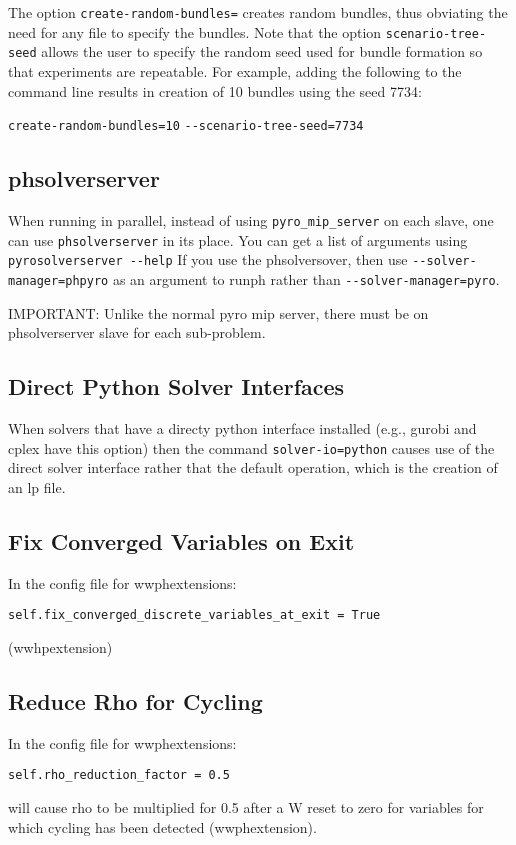 The option \verb|create-random-bundles=| creates random bundles, thus obviating the need for
any file to specify the bundles. Note that the option \verb|scenario-tree-seed| allows the user to specify the random seed used
for bundle formation so that experiments are repeatable.  For example, adding the following to the command line results in creation
of 10 bundles using the seed 7734:

\verb|create-random-bundles=10| \verb|--scenario-tree-seed=7734| 

\subsection{phsolverserver}

When running in parallel, instead of using  \verb|pyro_mip_server| on each slave, one can use
\verb|phsolverserver| in its place. 
You can get a list of arguments using \verb|pyrosolverserver --help|
If you use the phsolversover, then use \verb|--solver-manager=phpyro| as an argument to runph rather
than \verb|--solver-manager=pyro|.

IMPORTANT: Unlike the normal pyro mip server, there must be on phsolverserver slave for each sub-problem. 

\subsection{Direct Python Solver Interfaces}

When solvers that have a directy python interface installed (e.g., gurobi and cplex have this option) then the command \verb|solver-io=python| causes use of the direct solver interface rather that the default operation, which is the creation of an lp file.

\subsection{Fix Converged Variables on Exit}

In the config file for wwphextensions:

\verb|self.fix_converged_discrete_variables_at_exit = True|

(wwhpextension)

\subsection{Reduce Rho for Cycling}

In the config file for wwphextensions:

\verb|self.rho_reduction_factor = 0.5|

will cause rho to be multiplied for 0.5 after a W reset to zero for
variables for which cycling has been detected (wwphextension).


